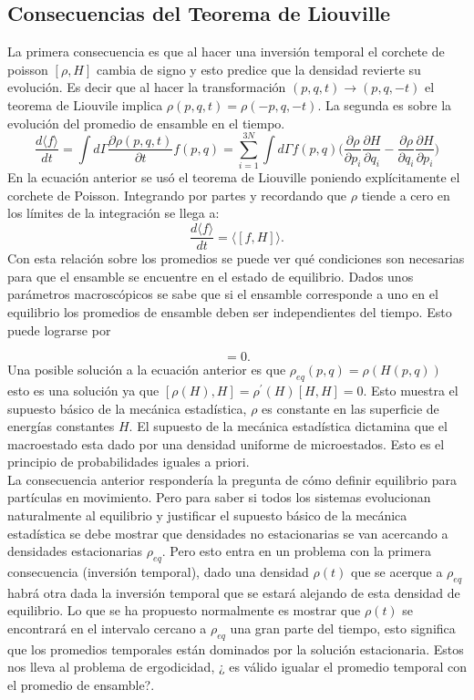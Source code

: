 \subsection{Consecuencias del Teorema de Liouville}
La primera consecuencia es que al hacer una inversión temporal el corchete de poisson $[\rho, H]$ cambia de signo y esto predice que la densidad revierte su evolución. Es decir que al hacer la transformación $(p,q,t) \to (p,q,-t)$ el teorema de Liouvile implica $\rho(p,q,t)=\rho(-p,q,-t)$.
La segunda es sobre la evolución del promedio de ensamble en el tiempo.
\begin{equation}
\frac{d \langle f \rangle}{dt}= \int d \Gamma \frac{\partial \rho(p,q,t)}{\partial t} f(p,q)= \sum_{i=1}^{3N} \int d\Gamma f(p,q) \Big( \frac{\partial \rho}{\partial p_{i}}\frac{\partial H}{\partial q_{i}} - \frac{\partial \rho}{\partial q_{i}}\frac{\partial H}{\partial p_{i}}  \Big)
\end{equation}
En la ecuación anterior se usó el teorema de Liouville poniendo explícitamente el corchete de Poisson. Integrando por partes y recordando que $\rho$ tiende a cero en los límites de la integración se llega a:
\begin{equation}
\frac{d \langle f \rangle}{dt}= \langle [f,H] \rangle.
\end{equation}
Con esta relación sobre los promedios se puede ver qué condiciones son necesarias para que el ensamble se encuentre en el estado de equilibrio. Dados unos parámetros macroscópicos se sabe que si el ensamble corresponde a uno en el equilibrio los promedios de ensamble deben ser independientes del tiempo. Esto puede lograrse por
 
\begin{equation}
[\rho_{eq}, H]=0.
\end{equation}
Una posible solución a la ecuación anterior es que $\rho_{eq}(p,q)=\rho(H(p,q))$ esto es una solución ya que $[\rho(H),H]=\rho^{'}(H)[H,H]=0$. Esto muestra el supuesto básico de la mecánica estadística, $\rho$ es constante en las superficie de energías constantes $H$. El supuesto de la mecánica estadística dictamina que el macroestado esta dado por una densidad uniforme de microestados. Esto es el principio de probabilidades iguales  a priori.
\\
La consecuencia anterior respondería la pregunta de cómo definir equilibrio para partículas en movimiento. Pero para saber si todos los sistemas evolucionan naturalmente al equilibrio  y justificar el supuesto básico de la mecánica estadística se debe mostrar que densidades no estacionarias se van acercando a densidades estacionarias $\rho_{eq}$. Pero esto entra en un problema con la primera consecuencia (inversión temporal), dado una densidad $\rho(t)$ que se acerque a $\rho_{eq}$ habrá otra dada la inversión temporal que se estará alejando de esta densidad de equilibrio. Lo que se ha propuesto normalmente es mostrar que $\rho(t)$ se encontrará en el intervalo cercano a $\rho_{eq}$ una gran parte del tiempo, esto significa que los promedios temporales están dominados por la solución estacionaria. Estos nos lleva al problema de ergodicidad, ¿ es válido igualar el promedio temporal con el promedio de ensamble?. 
\\
